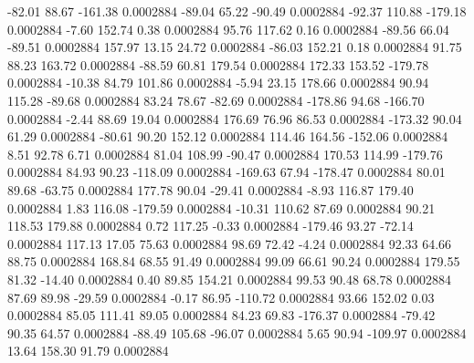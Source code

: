       -82.01       88.67     -161.38     0.0002884
      -89.04       65.22      -90.49     0.0002884
      -92.37      110.88     -179.18     0.0002884
       -7.60      152.74        0.38     0.0002884
       95.76      117.62        0.16     0.0002884
      -89.56       66.04      -89.51     0.0002884
      157.97       13.15       24.72     0.0002884
      -86.03      152.21        0.18     0.0002884
       91.75       88.23      163.72     0.0002884
      -88.59       60.81      179.54     0.0002884
      172.33      153.52     -179.78     0.0002884
      -10.38       84.79      101.86     0.0002884
       -5.94       23.15      178.66     0.0002884
       90.94      115.28      -89.68     0.0002884
       83.24       78.67      -82.69     0.0002884
     -178.86       94.68     -166.70     0.0002884
       -2.44       88.69       19.04     0.0002884
      176.69       76.96       86.53     0.0002884
     -173.32       90.04       61.29     0.0002884
      -80.61       90.20      152.12     0.0002884
      114.46      164.56     -152.06     0.0002884
        8.51       92.78        6.71     0.0002884
       81.04      108.99      -90.47     0.0002884
      170.53      114.99     -179.76     0.0002884
       84.93       90.23     -118.09     0.0002884
     -169.63       67.94     -178.47     0.0002884
       80.01       89.68      -63.75     0.0002884
      177.78       90.04      -29.41     0.0002884
       -8.93      116.87      179.40     0.0002884
        1.83      116.08     -179.59     0.0002884
      -10.31      110.62       87.69     0.0002884
       90.21      118.53      179.88     0.0002884
        0.72      117.25       -0.33     0.0002884
     -179.46       93.27      -72.14     0.0002884
      117.13       17.05       75.63     0.0002884
       98.69       72.42       -4.24     0.0002884
       92.33       64.66       88.75     0.0002884
      168.84       68.55       91.49     0.0002884
       99.09       66.61       90.24     0.0002884
      179.55       81.32      -14.40     0.0002884
        0.40       89.85      154.21     0.0002884
       99.53       90.48       68.78     0.0002884
       87.69       89.98      -29.59     0.0002884
       -0.17       86.95     -110.72     0.0002884
       93.66      152.02        0.03     0.0002884
       85.05      111.41       89.05     0.0002884
       84.23       69.83     -176.37     0.0002884
      -79.42       90.35       64.57     0.0002884
      -88.49      105.68      -96.07     0.0002884
        5.65       90.94     -109.97     0.0002884
       13.64      158.30       91.79     0.0002884

